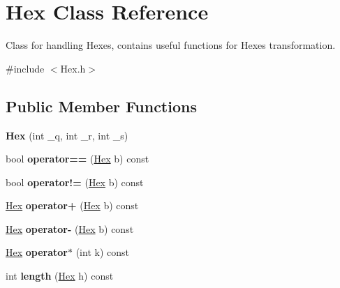 \hypertarget{classHex}{}\section{Hex Class Reference}
\label{classHex}


Class for handling Hexes, contains useful functions for Hexes transformation.  




{\ttfamily \#include $<$Hex.\+h$>$}

\subsection*{Public Member Functions}
\begin{DoxyCompactItemize}
\item 
{\bfseries Hex} (int \+\_\+q, int \+\_\+r, int \+\_\+s)\hypertarget{classHex_a80912c749ac053d8c8dfe048153a082f}{}\label{classHex_a80912c749ac053d8c8dfe048153a082f}

\item 
bool {\bfseries operator==} (\hyperlink{classHex}{Hex} b) const \hypertarget{classHex_a91a4aaf6c05a7daf2fa4b37274f1cc07}{}\label{classHex_a91a4aaf6c05a7daf2fa4b37274f1cc07}

\item 
bool {\bfseries operator!=} (\hyperlink{classHex}{Hex} b) const \hypertarget{classHex_a6a94e713daf6d64fa3a4b51c387842a0}{}\label{classHex_a6a94e713daf6d64fa3a4b51c387842a0}

\item 
\hyperlink{classHex}{Hex} {\bfseries operator+} (\hyperlink{classHex}{Hex} b) const \hypertarget{classHex_a9c560b8ecc36dc56bca3ad473e3b5916}{}\label{classHex_a9c560b8ecc36dc56bca3ad473e3b5916}

\item 
\hyperlink{classHex}{Hex} {\bfseries operator-\/} (\hyperlink{classHex}{Hex} b) const \hypertarget{classHex_ac591a09448fb9ab6a90e33bb7099757c}{}\label{classHex_ac591a09448fb9ab6a90e33bb7099757c}

\item 
\hyperlink{classHex}{Hex} {\bfseries operator$\ast$} (int k) const \hypertarget{classHex_a93760b2e9ecdecff1e4780b5299dc83a}{}\label{classHex_a93760b2e9ecdecff1e4780b5299dc83a}

\item 
int {\bfseries length} (\hyperlink{classHex}{Hex} h) const \hypertarget{classHex_a0a53db47c686e369f860914dcd9fbc31}{}\label{classHex_a0a53db47c686e369f860914dcd9fbc31}


\end{DoxyCompactItemize}
